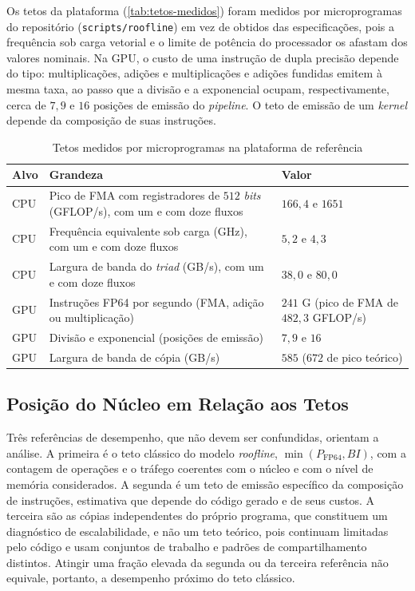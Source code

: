 Os tetos da plataforma (\autoref{tab:tetos-medidos}) foram medidos por microprogramas do repositório (\texttt{scripts/roofline}) em vez de obtidos das especificações, pois a frequência sob carga vetorial e o limite de potência do processador os afastam dos valores nominais.
Na GPU, o custo de uma instrução de dupla precisão depende do tipo: multiplicações, adições e multiplicações e adições fundidas emitem à mesma taxa, ao passo que a divisão e a exponencial ocupam, respectivamente, cerca de \(7{,}9\) e \(16\) posições de emissão do \textit{pipeline}.
O teto de emissão de um \textit{kernel} depende da composição de suas instruções.

\begin{table}[H]
    \centering
    \caption{Tetos medidos por microprogramas na plataforma de referência}
    \label{tab:tetos-medidos}
    \footnotesize
    \begin{tabular}{lp{7.6cm}p{4.6cm}}
        \toprule
        Alvo & Grandeza & Valor \\
        \midrule
        CPU & Pico de FMA com registradores de $512$ \textit{bits} (GFLOP/s), com um e com doze fluxos & $166{,}4$ e $1651$ \\
        CPU & Frequência equivalente sob carga (GHz), com um e com doze fluxos & $5{,}2$ e $4{,}3$ \\
        CPU & Largura de banda do \textit{triad} (GB/s), com um e com doze fluxos & $38{,}0$ e $80{,}0$ \\
        \midrule
        GPU & Instruções FP64 por segundo (FMA, adição ou multiplicação) & $241$ G (pico de FMA de $482{,}3$ GFLOP/s) \\
        GPU & Divisão e exponencial (posições de emissão) & $7{,}9$ e $16$ \\
        GPU & Largura de banda de cópia (GB/s) & $585$ ($672$ de pico teórico) \\
        \bottomrule
    \end{tabular}
\end{table}

\subsection{Posição do Núcleo em Relação aos Tetos}\label{subsec:posicao-nucleo-tetos}

Três referências de desempenho, que não devem ser confundidas, orientam a análise.
A primeira é o teto clássico do modelo \textit{roofline}, \(\min(P_{\mathrm{FP64}},B I)\), com a contagem de operações e o tráfego coerentes com o núcleo e com o nível de memória considerados.
A segunda é um teto de emissão específico da composição de instruções, estimativa que depende do código gerado e de seus custos.
A terceira são as cópias independentes do próprio programa, que constituem um diagnóstico de escalabilidade, e não um teto teórico, pois continuam limitadas pelo código e usam conjuntos de trabalho e padrões de compartilhamento distintos.
Atingir uma fração elevada da segunda ou da terceira referência não equivale, portanto, a desempenho próximo do teto clássico.

